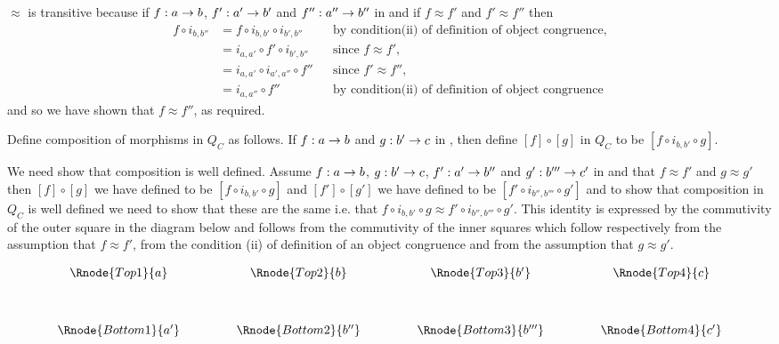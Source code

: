 \documentclass[10pt,a4paper]{scrartcl}
\begin{document}
$\approx$ is transitive because 
if $f: a \rightarrow b$, $f': a' \rightarrow b'$ and $f'': a'' \rightarrow b''$ in  \catcw and if $f \approx f'$ and $f' \approx f''$ then
\begin{align*}
f \circ i_{b,b''} &=  f \circ i_{b,b'} \circ i_{b',b''}  && \mbox{by condition(ii) of definition of object congruence,} \\
                  &= i_{a,a'} \circ f' \circ i_{b',b''}  && \mbox{since $f \approx f'$}, \\
									&= i_{a,a'} \circ i_{a',a''} \circ f'' && \mbox{since $f' \approx f''$}, \\
									&= i_{a,a''} \circ f''                 && \mbox{by condition(ii) of definition of object congruence}
\end{align*}
and so we have shown that $f \approx f''$, as required.

Define composition of morphisms in $Q_C$ as follows.  If
 $f:a \rightarrow b$ and $g: b' \rightarrow c$ in \catcw, then define $[f] \circ [g]$ in $Q_C$ to be $[f \circ i_{b,b'} \circ g]$.

We need show that composition is well defined.  Assume $f:a \rightarrow b$, $g: b' \rightarrow c$, $f':a' \rightarrow b''$ and $g': b''' \rightarrow c'$ in \catcw and that
$f \approx f'$ and $g \approx g'$ then 
$[f] \circ [g]$ we have defined to be $[f \circ i_{b,b'} \circ g]$  and $[f']  \circ [g']$ we have defined to be $[f' \circ i_{b'',b'''} \circ g']$
and to show that composition in $Q_C$ is well defined we need to show that these are the same i.e. that $f \circ i_{b,b'} \circ g \approx f' \circ i_{b'',b'''} \circ g'$. This identity
is expressed by the commutivity of the outer square in the diagram below and follows from the commutivity of the inner squares which follow respectively from the assumption that $f \approx f'$,
from the condition (ii) of definition of an object congruence and from the assumption that $g \approx g'$.

\vspace{3mm}
\begin{center}
\begin{displaymath}
\begin{array}{cp{.9cm}cp{.9cm}cp{.9cm}c}
\Rnode{Top1}{a} & & \Rnode{Top2}{b}  & & \Rnode{Top3}{b'} && \Rnode{Top4}{c}\\ [1.2cm]
\Rnode{Bottom1}{a'} & & \Rnode{Bottom2}{b''}  & & \Rnode{Bottom3}{b'''} && \Rnode{Bottom4}{c'}
\end{array}
\end{displaymath}
\end{center}
\end{document}
